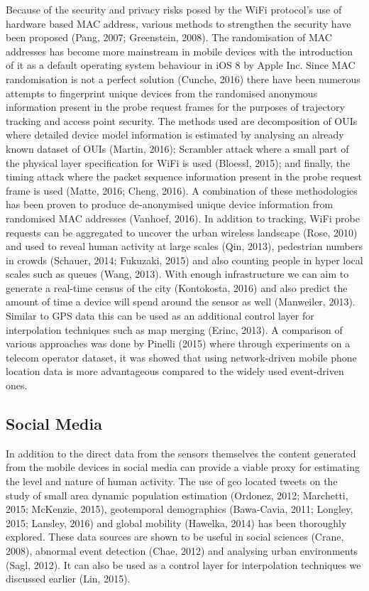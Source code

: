 Because of the security and privacy risks posed by the WiFi protocol’s use of hardware based MAC address, various methods to strengthen the security have been proposed (Pang, 2007; Greenstein, 2008).
The randomisation of MAC addresses has become more mainstream in mobile devices with the introduction of it as a default operating system behaviour in iOS 8 by Apple Inc.
Since MAC randomisation is not a perfect solution (Cunche, 2016) there have been numerous attempts to fingerprint unique devices from the randomised anonymous information present in the probe request frames for the purposes of trajectory tracking and access point security.
The methods used are decomposition of OUIs where detailed device model information is estimated by analysing an already known dataset of OUIs (Martin, 2016); Scrambler attack where a small part of the physical layer specification for WiFi is used (Bloessl, 2015); and finally, the timing attack where the packet sequence information present in the probe request frame is used (Matte, 2016; Cheng, 2016).
A combination of these methodologies has been proven to produce de-anonymised unique device information from randomised MAC addresses (Vanhoef, 2016).
In addition to tracking, WiFi probe requests can be aggregated to uncover the urban wireless landscape (Rose, 2010) and used to reveal human activity at large scales (Qin, 2013), pedestrian numbers in crowds (Schauer, 2014; Fukuzaki, 2015) and also counting people in hyper local scales such as queues (Wang, 2013).
With enough infrastructure we can aim to generate a real-time census of the city (Kontokosta, 2016) and also predict the amount of time a device will spend around the sensor as well (Manweiler, 2013).
Similar to GPS data this can be used as an additional control layer for interpolation techniques such as map merging (Erinc, 2013).
A comparison of various approaches was done by Pinelli (2015) where through experiments on a telecom operator dataset, it was showed that using network-driven mobile phone location data is more advantageous compared to the widely used event-driven ones.

\subsection{Social Media}

In addition to the direct data from the sensors themselves the content generated from the mobile devices in social media can provide a viable proxy for estimating the level and nature of human activity.
The use of geo located tweets on the study of small area dynamic population estimation (Ordonez, 2012; Marchetti, 2015; McKenzie, 2015), geotemporal demographics (Bawa-Cavia, 2011; Longley, 2015; Lansley, 2016) and global mobility (Hawelka, 2014) has been thoroughly explored.
These data sources are shown to be useful in social sciences (Crane, 2008), abnormal event detection (Chae, 2012) and analysing urban environments (Sagl, 2012).
It can also be used as a control layer for interpolation techniques we discussed earlier (Lin, 2015).

